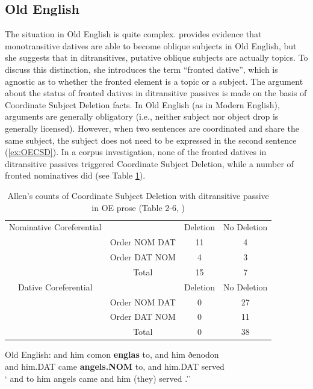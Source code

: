 \subsection{Old English}
	The situation in Old English is quite complex. \cite{Allen.1999} provides evidence that monotransitive datives are able to become oblique subjects in Old English, but she suggests that in ditransitives, putative oblique subjects are actually topics. To discuss this distinction, she introduces the term ``fronted dative'', which is agnostic as to whether the fronted element is a topic or a subject. The argument about the status of fronted datives in ditransitive passives is made on the basis of Coordinate Subject Deletion facts. In Old English (as in Modern English), arguments are generally obligatory (i.e., neither subject nor object drop is generally licensed). However, when two sentences are coordinated and share the same subject, the subject does not need to be expressed in the second sentence (\ref{ex:OECSD}). In a corpus investigation, none of the fronted datives in ditransitive passives triggered Coordinate Subject Deletion, while a number of fronted nominatives did (see Table \ref{tab:AllenOECSD}). 

	\begin{table}[t]
		\begin{tabular}{cccc}
			Nominative Coreferential & & Deletion & No Deletion \\
			& Order NOM DAT & 11 & 4 \\
			& Order DAT NOM & 4 & 3 \\
			& Total & 15 & 7 \\
			\hline
			Dative Coreferential & & Deletion & No Deletion \\
			& Order NOM DAT & 0 & 27 \\
			& Order DAT NOM & 0 & 11 \\
			& Total & 0 & 38 \\
		\end{tabular}
		\caption{Allen's counts of Coordinate Subject Deletion with ditransitive passive in OE prose (Table 2-6, \citealt{Allen.1999})}
		\label{tab:AllenOECSD}
	\end{table}

	\begin{exe}
		\ex \label{ex:OECSD} Old English:
		\gll and him comon \textbf{englas} to, and him ðenodon\\
		and him.DAT came \textbf{angels.NOM} to, and him.DAT served\\
		\trans ` and to him angels came and him (they) served \citep[ex. 34]{Allen.1999}.''
	\end{exe}

